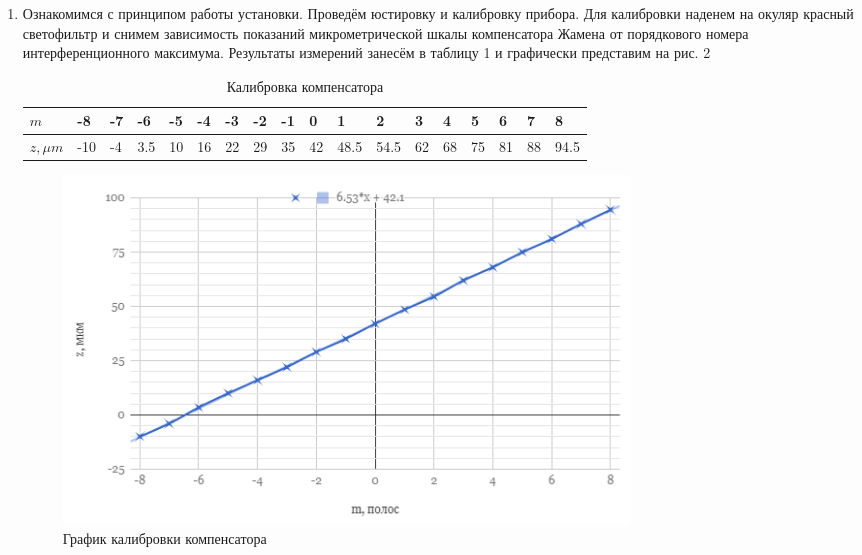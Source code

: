 \documentclass[a4paper]{article}
\begin{document}
\begin{enumerate}
    \item Ознакомимся с принципом работы установки. Проведём юстировку и калибровку прибора. Для калибровки наденем на окуляр красный светофильтр и снимем зависимость показаний микрометрической шкалы компенсатора Жамена от порядкового номера интерференционного максимума. Результаты измерений занесём в таблицу 1 и графически представим на рис. 2
    
        \begin{table}[h]
    \centering
    \begin{center}
    \caption{Калибровка компенсатора}
    \end{center}
    \vspace{0.1cm}
    \label{tab:my_label}
    \begin{tabular}{ |p{1cm}||p{0.5cm}|p{0.5cm}|p{0.5cm}|p{0.5cm}|p{0.5cm}|p{0.5cm}|p{0.5cm}|p{0.5cm}| p{0.5cm}|p{0.5cm}|p{0.5cm}|p{0.5cm}|p{0.5cm}|p{0.5cm}|p{0.5cm}|p{0.5cm}| p{0.5cm}|}
 \hline
$m$ & -8 & -7 & -6 & -5 & -4 & -3 & -2 & -1 & 0 & 1 & 2 & 3 & 4 & 5 & 6 & 7 & 8\\
 \hline
 $z, \mu m$ & -10 & -4 & 3.5 & 10 & 16 & 22 & 29 & 35 & 42 & 48.5 & 54.5 & 62 & 68 & 75 & 81 & 88 & 94.5\\

 \hline
 
\end{tabular}
\end{table}

    \begin{figure}[h]
    \centering
    \includegraphics[width=15cm]{graph2.PNG}
    \caption{График калибровки компенсатора}
    \label{fig:vac}
\end{figure}


\end{enumerate}
\end{document}
